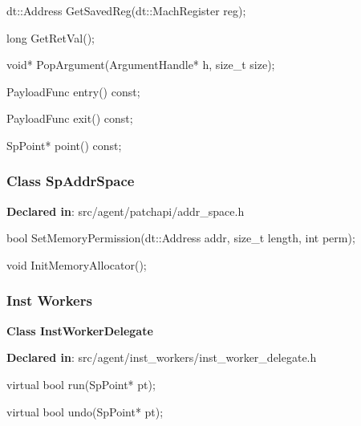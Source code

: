 \begin{apient}
dt::Address GetSavedReg(dt::MachRegister reg);
\end{apient}
\apidesc{
}

\begin{apient}
long GetRetVal();
\end{apient}
\apidesc{
}

\begin{apient}
void* PopArgument(ArgumentHandle* h, size_t size);
\end{apient}
\apidesc{
}

\begin{apient}
PayloadFunc entry() const;
\end{apient}
\apidesc{
}

\begin{apient}
PayloadFunc exit() const;
\end{apient}
\apidesc{
}

\begin{apient}
SpPoint* point() const;
\end{apient}
\apidesc{
}


\subsubsection{Class SpAddrSpace}
\textbf{Declared in}: src/agent/patchapi/addr\_space.h

\begin{apient}
bool SetMemoryPermission(dt::Address addr,
                         size_t length,
                         int perm);
\end{apient}
\apidesc{
}

\begin{apient}
void InitMemoryAllocator();
\end{apient}
\apidesc{
}

\subsubsection{Inst Workers}

\textbf{Class InstWorkerDelegate}

\textbf{Declared in}: src/agent/inst\_workers/inst\_worker\_delegate.h

\begin{apient}
virtual bool run(SpPoint* pt);
\end{apient}

\begin{apient}
virtual bool undo(SpPoint* pt);
\end{apient}

